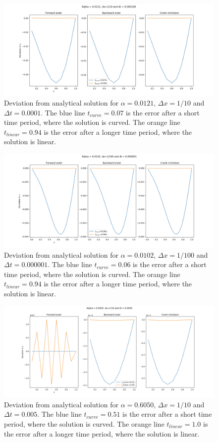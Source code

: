\documentclass{article}
\begin{document}
\begin{figure}[H]
	\centering
	\includegraphics[width=180mm]{1_10}
	\caption{Deviation from analytical solution for $\alpha=0.0121$, $\Delta x=1/10$ and $\Delta t =0.0001$. The blue line $t_{curve}=0.07$ is the error after a short time period, where the solution is curved. The orange line $t_{linear}=0.94$ is the error after a longer time period, where the solution is linear.}
	\label{fig:1_10}
\end{figure}

\begin{figure}[H]
	\centering
	\includegraphics[width=180mm]{1_100}
	\caption{Deviation from analytical solution for $\alpha=0.0102$, $\Delta x=1/100$ and $\Delta t =0.000001$. The blue line $t_{curve}=0.06$ is the error after a short time period, where the solution is curved. The orange line $t_{linear}=0.94$ is the error after a longer time period, where the solution is linear.}
	\label{fig:1_100}
\end{figure}

\begin{figure}[H]
	\centering
	\includegraphics[width=180mm]{1_10_a}
	\caption{Deviation from analytical solution for $\alpha=0.6050$, $\Delta x=1/10$ and $\Delta t =0.005$. The blue line $t_{curve}=0.51$ is the error after a short time period, where the solution is curved. The orange line $t_{linear}=1.0$ is the error after a longer time period, where the solution is linear.}
	\label{fig:1_10_a}
\end{figure}
\end{document}
